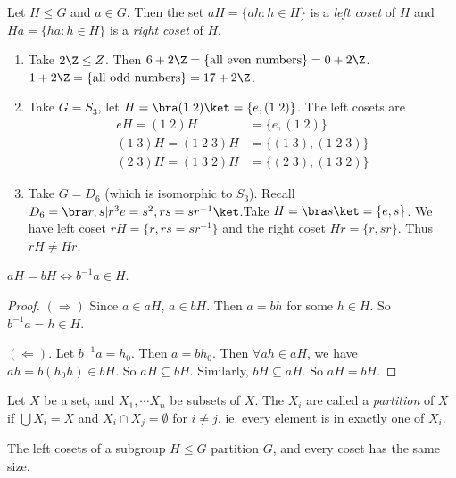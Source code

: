 \documentclass[a4paper]{article}
\begin{document}
\begin{defi}[Cosets]
  Let $H\leq G$ and $a\in G$. Then the set $aH =\{ah : h\in H\}$ is a \emph{left coset} of $H$ and $Ha = \{ha : h\in H\}$ is a \emph{right coset} of $H$.
\end{defi}
\begin{eg}\leavevmode
  \begin{enumerate}
    \item Take $2\Z \leq Z$. Then $6 + 2\Z = \{\text{all even numbers}\} = 0 + 2\Z$. $1 + 2\Z = \{\text{all odd numbers}\} = 17 + 2\Z$.
    \item Take $G = S_3$, let $H = \bra (1\; 2)\ket = \{e, (1\; 2)\}$. The left cosets are
      \begin{align*}
        eH = (1\; 2)H &= \{e, (1\; 2)\}\\
        (1\; 3)H = (1\; 2\; 3)H &= \{(1\; 3), (1\; 2\; 3)\}\\
        (2\; 3)H = (1\; 3\; 2)H &= \{(2\; 3), (1\; 3\; 2)\}
      \end{align*}
    \item Take $G = D_6$ (which is isomorphic to $S_3$). Recall $D_6 = \bra r, s | r^3 e = s^2, rs = sr^{-1}\ket$.Take $H = \bra s\ket = \{e, s\}$. We have left coset $rH = \{r, rs = sr^{-1}\}$ and the right coset $Hr = \{r, sr\}$. Thus $rH \not= Hr$.
  \end{enumerate}
\end{eg}

\begin{prop}
  $aH = bH \Leftrightarrow b^{-1}a\in H$.
\end{prop}
\begin{proof}
  $(\Rightarrow)$ Since $a\in aH$, $a\in bH$. Then $a = bh$ for some $h\in H$. So $b^{-1}a = h\in H$.

  $(\Leftarrow)$. Let $b^{-1}a = h_0$. Then $a = bh_0$. Then $\forall ah\in aH$, we have $ah = b(h_0h)\in bH$. So $aH \subseteq bH$. Similarly, $bH\subseteq aH$. So $aH = bH$.
\end{proof}


\begin{defi}[Partition]
  Let $X$ be a set, and $X_1, \cdots X_n$ be subsets of $X$. The $X_i$ are called a \emph{partition} of $X$ if $\bigcup X_i = X$ and $X_i\cap X_j = \emptyset$ for $i\not= j$. ie. every element is in exactly one of $X_i$.
\end{defi}

\begin{lemma}
  The left cosets of a subgroup $H\leq G$ partition $G$, and every coset has the same size.
\end{lemma}
\end{document}
